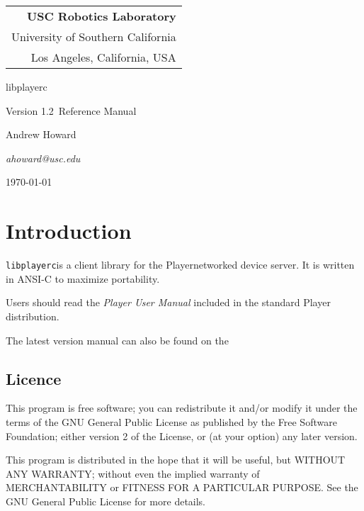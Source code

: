 \documentclass[11pt]{report}
\def\VERSION {1.2}
\def\libplayerc {{\tt libplayerc}}
\def\player {Player}
\begin{document}
\setcounter{page}{0}

\titlepage

\begin{flushright}
\begin{tabular}{r}
{\bf USC Robotics Laboratory}\\
University of Southern California\\
Los Angeles, California, USA\\
\end{tabular}
\end{flushright}

\vspace{5cm}
\centerline{\huge{libplayerc}}
\vspace{0.5cm}
\centerline{\large{Version \VERSION\ Reference Manual}}
\vspace{2cm}

\centerline{\large Andrew Howard}
\centerline{\sl ahoward@usc.edu}
\vspace{5cm}
\centerline{\today}

\newpage
\tableofcontents

\newpage
\setcounter{page}{0}

\chapter{Introduction}

\libplayerc is a client library for the \player networked device server.
It is written in ANSI-C to maximize portability.

Users should read the {\em Player User Manual} included in the standard
Player distribution.  

The latest version  manual can also be found on the

\section{Licence}

This program is free software; you can redistribute it and/or
modify it under the terms of the GNU General Public License
as published by the Free Software Foundation; either version 2
of the License, or (at your option) any later version.

This program is distributed in the hope that it will be useful,
but WITHOUT ANY WARRANTY; without even the implied warranty of
MERCHANTABILITY or FITNESS FOR A PARTICULAR PURPOSE.  See the
GNU General Public License for more details.
\end{document}
